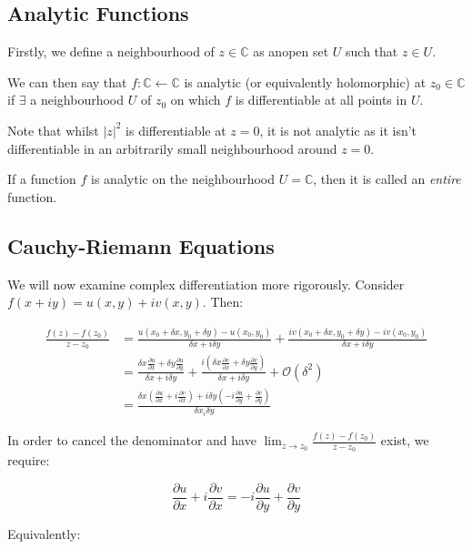 \documentclass{../../physics_notes}
\begin{document}
\subsection{Analytic Functions}

Firstly, we define a neighbourhood of $z\in \mathbb{C}$ as anopen set $U$ such that $z \in U$.

We can then say that $f: \mathbb{C} \leftarrow \mathbb{C}$ is analytic (or equivalently holomorphic) at $z_0 \in \mathbb{C}$ if $\exists$ a neighbourhood $U$ of $z_0$ on which $f$ is differentiable at all points in $U$.

Note that whilst $|z|^2$ is differentiable at $z = 0$, it is not analytic as it isn't differentiable in an arbitrarily small neighbourhood around $z=0$.

If a function $f$ is analytic on the neighbourhood $U = \mathbb{C}$, then it is called an \emph{entire} function.

\subsection{Cauchy-Riemann Equations}

We will now examine complex differentiation more rigorously. Consider $f(x + iy) = u(x,y) + iv(x,y)$. Then:

\begin{align*}
\frac{f(z) - f(z_0)}{z-z_0} &= \frac{u(x_0 + \delta x, y_0 + \delta y) -u(x_0, y_0)}{\delta x + i\delta y} + \frac{iv(x_0 + \delta x, y_0 + \delta y) - iv(x_0,y_0)}{\delta x + i\delta y} \\
&= \frac{\delta x \frac{\partial u}{\partial x} + \delta y \frac{\partial u}{\partial y}}{\delta x + i\delta y} + \frac{i \left(\delta x \frac{\partial v}{\partial x} + \delta y \frac{\partial v}{\partial y} \right)}{\delta x + i\delta y} + \mathcal{O}(\delta^2) \\
&= \frac{\delta x \left(\frac{\partial u}{\partial x} + i\frac{\partial v}{\partial x}\right) + i\delta y \left(-i\frac{\partial u}{\partial y} + \frac{\partial v}{\partial y}\right)}{\delta x _ i\delta y}
\end{align*}

In order to cancel the denominator and have $\lim_{z\to z_0} \frac{f(z) - f(z_0)}{z-z_0}$ exist, we require:

\[ \frac{\partial u}{\partial x} + i\frac{\partial v}{\partial x} = -i\frac{\partial u}{\partial y} + \frac{\partial v}{\partial y} \]

Equivalently:
\end{document}
